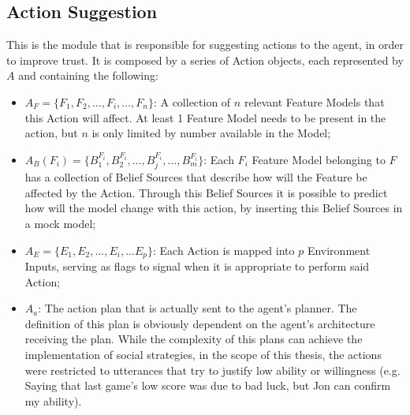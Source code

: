 \subsection{Action Suggestion}
\label{subsec:ActionSuggestion}

This is the module that is responsible for suggesting actions to the agent, in order to improve trust. It is composed by a series of Action objects, each represented by $A$ and containing the following:
\begin{itemize}
    \item $A_F = \{F_1, F_2, ..., F_i, ..., F_n\}$: A collection of $n$ relevant Feature Models that this Action will affect. At least 1 Feature Model needs to be present in the action, but $n$ is only limited by number available in the Model;
    \item $A_B(F_i) = \{B_1^{F_i}, B_2^{F_i}, ..., B_j^{F_i}, ..., B_m^{F_i}\}$: Each $F_i$ Feature Model belonging to $F$ has a collection of Belief Sources that describe how will the Feature be affected by the Action. Through this Belief Sources it is possible to predict how will the model change with this action, by inserting this Belief Sources in a mock model;
    \item $A_E = \{E_1, E_2, ..., E_i, ... E_p\}$: Each Action is mapped into $p$ Environment Inputs, serving as flags to signal when it is appropriate to perform said Action;
    \item $A_a$: The action plan that is actually sent to the agent's planner. The definition of this plan is obviously dependent on the agent's architecture receiving the plan. While the complexity of this plans can achieve the implementation of social strategies, in the scope of this thesis, the actions were restricted to utterances that try to justify low ability or willingness (e.g. Saying that last game's low score was due to bad luck, but Jon can confirm my ability).
\end{itemize}

